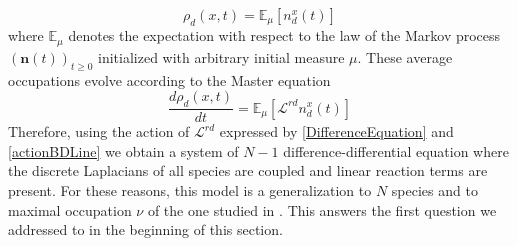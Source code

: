 \documentclass[10pt]{article}
\numberwithin{equation}{section}
\numberwithin{equation}{subsection}
\begin{document}
\begin{equation}
	\rho_{d}(x,t)=\mathbb{E}_{\mu}\left[n_{d}^{x}(t)\right]
\end{equation}
where $\mathbb{E}_{\mu}$ denotes the expectation with respect to the law of the Markov process $(\bm{n}(t))_{t\geq 0}$ initialized with arbitrary initial measure $\mu$. These average occupations evolve according to the Master equation
\begin{equation}
	\frac{d \rho_{d}(x,t)}{dt}=\mathbb{E}_{\mu}\left[\mathcal{L}^{rd}n_{d}^{x}(t)\right]
\end{equation} 
Therefore, using the action of $\mathcal{L}^{rd}$ expressed by \eqref{DifferenceEquation} and \eqref{actionBDLine} we obtain a system of $N-1$ difference-differential equation where the discrete Laplacians of all species are coupled and linear reaction terms are present. For these reasons, this model is a generalization to $N$ species and to maximal occupation $\nu$ of the one studied in \cite{casini2022uphill}. This answers the first question we addressed to in the beginning of this section. 
\end{document}

